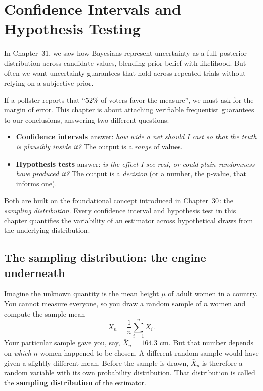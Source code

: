 \chapter{Confidence Intervals and Hypothesis Testing}

In Chapter~31, we saw how Bayesians represent uncertainty as a full posterior
distribution across candidate values, blending prior belief with likelihood. But
often we want uncertainty guarantees that hold across repeated trials without
relying on a subjective prior.

If a pollster reports that ``$52\%$ of voters favor the measure'', we must ask for the margin of error. This chapter is about attaching verifiable frequentist guarantees to our conclusions, answering two different questions:

\begin{itemize}
  \item \textbf{Confidence intervals} answer: \emph{how wide a net should I cast so that
  the truth is plausibly inside it?} The output is a \emph{range} of values.
  \item \textbf{Hypothesis tests} answer: \emph{is the effect I see real, or could plain
  randomness have produced it?} The output is a \emph{decision} (or a number, the
  p-value, that informs one).
\end{itemize}

Both are built on the foundational concept introduced in Chapter~30: the \emph{sampling
distribution}. Every confidence interval and hypothesis test in this chapter quantifies
the variability of an estimator across hypothetical draws from the underlying distribution.

\section{The sampling distribution: the engine underneath}
\label{ch32:sampling}

Imagine the unknown quantity is the mean height $\mu$ of adult women in a country. You
cannot measure everyone, so you draw a random sample of $n$ women and compute the
sample mean
\[
  \bar X_n = \frac{1}{n}\sum_{i=1}^n X_i .
\]
Your particular sample
gave you, say, $\bar X_n = 164.3$ cm. But that number depends on \emph{which}
$n$ women happened to be chosen. A different random sample would have given a slightly
different mean. Before the sample is drawn, $\bar X_n$ is therefore a random variable
with its own probability distribution. That distribution is called the \textbf{sampling
distribution} of the estimator.

